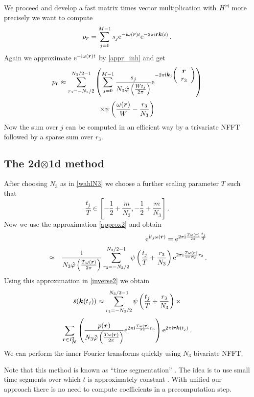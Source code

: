 \documentclass[journal]{IEEEtran}
\def\ti{\mbox{\scriptsize{\rm i}}}
\newcommand{\eip}[1]{{\rm e}^{ 2\pi{\ti} #1}}
\newcommand{\eim}[1]{{\rm e}^{-2\pi{\ti} #1}}
\newcommand{\zb}[1]{\mbox{\boldmath{${#1}$}}}
\newcommand{\zbs}[1]{\mbox{\boldmath\scriptsize{${#1}$}}}
\newcommand{\zbss}[1]{\mbox{\boldmath\tiny{${#1}$}}}
\newcommand{\adj}{{\vdash \hspace*{-1.72mm} \dashv}}
\numberwithin{equation}{section}
\numberwithin{table}{section}
\numberwithin{figure}{section}
\begin{document}
We proceed and develop a fast matrix times vector
multiplication with $H^{\adj}$ more precisely we want to compute
\[
p_{\zbs r} =
\sum_{j=0}^{M-1} s_j 
{\rm e}^{-{\rm\scriptsize i}\omega(\zbs r)t}
{\rm e}^{-2\pi {\rm\scriptsize i}\zbs r \zbs k(t)}\, .
\]
Again we approximate ${\rm e}^{-{\rm\scriptsize i}\omega(\zbs r)t}$ by
\eqref{appr_inh} and get
\[
p_{\zbs r} \approx
\sum_{r_3=-N_3/2}^{N_3/2-1}\left(
\sum_{j=0}^{M-1} \frac{s_j}{N_3 \hat\varphi\left(\frac{Wt_j}{2\pi}\right)}
 \eim{\zbs k_j
\left(\begin{array}{c}
\zb r\\
r_3
\end{array}\right)}\right)
\]
\[
\times
\psi \left(\frac{\omega(\zb r)}{W}-\frac{r_3}{N_3}\right)
\]
Now the sum over $j$ can be computed in an efficient way by a
trivariate NFFT followed by a sparse sum over $r_3$.

\subsection{The 2d$\otimes$1d method}

After choosing $N_3$ as in \eqref{wahlN3} we choose a further scaling parameter $T$ such that
\[
\frac{t_j}{T}
\in[-\frac{1}{2}+\frac{m}{N_3},-\frac{1}{2}+\frac{m}{N_3}]\, . 
\]
Now we use the approximation \eqref{approx2} and obtain
\begin{eqnarray*}
&&{\rm e}^{\ti t_j \omega(\zbs r)} = 
\eip{\frac{T\omega(\zbss r)}{2\pi}\frac{t_j}{T}}\\ \nonumber
&\approx&
\frac{1}{N_3\hat\varphi\left(\frac{T\omega(\zbs r)}{2\pi}\right)}
\sum_{r_3=-N_3/2}^{N_3/2-1} 
\psi\left(\frac{t_j}{T}+\frac{r_3}{N_3}\right)  
\eip{\frac{T\omega(\zbss r)}{2\pi N_3}r_3}\, .
\end{eqnarray*}
Using this approximation in \eqref{inverse2} we obtain
\begin{equation*}
\tilde s(\zb k(t_j)) \approx
\sum_{r_3=-N_3/2}^{N_3/2-1}
\psi\left(\frac{t_j}{T}+\frac{r_3}{N_3}\right) \times
\end{equation*}
\begin{equation*}
\sum_{\zbs r \in I^2_{\zbss N}} 
\left(
\frac{p(\zb r)}{N_3\hat\varphi\left(\frac{T\omega(\zbs
      r)}{2\pi}\right)}
\eip{\frac{T\omega(\zbss r)}{2\pi}r_3}
\right)
{\rm e}^{2\pi {\rm\scriptsize i}\zbs r \zbs k(t_j)}\, .
\end{equation*}
We can perform the inner Fourier transforms quickly using $N_3$
bivariate NFFT.

Note that this method is known as ``time segmentation'' \cite{SuNoFe03}. The
idea is to use  small time segments over which $t$ is approximately
constant \cite{NoMe91}. With unified our approach there is no need to
compute coefficients in a precomputation step. 
\end{document}

